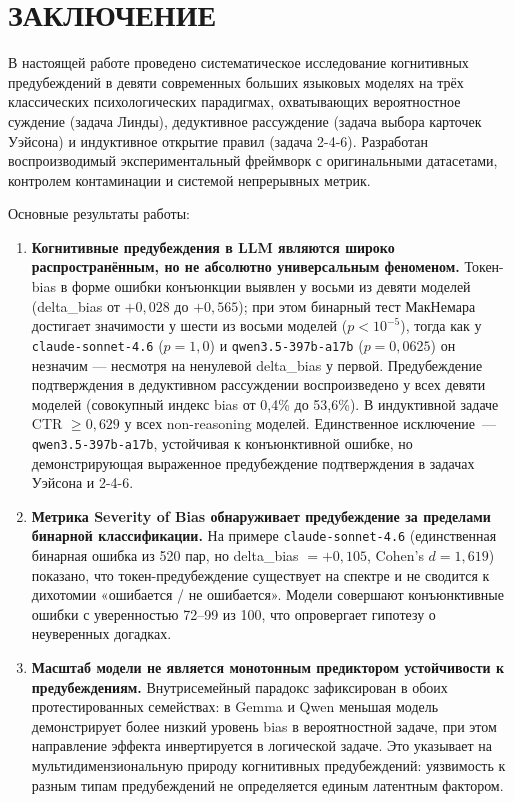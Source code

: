 \chapter*{ЗАКЛЮЧЕНИЕ}

В настоящей работе проведено систематическое исследование когнитивных предубеждений в девяти современных больших языковых моделях на трёх классических психологических парадигмах, охватывающих вероятностное суждение (задача Линды), дедуктивное рассуждение (задача выбора карточек Уэйсона) и индуктивное открытие правил (задача 2-4-6). Разработан воспроизводимый экспериментальный фреймворк с оригинальными датасетами, контролем контаминации и системой непрерывных метрик.

Основные результаты работы:

\begin{enumerate}
  \item \textbf{Когнитивные предубеждения в LLM являются широко распространённым, но не абсолютно универсальным феноменом.} Токен-bias в форме ошибки конъюнкции выявлен у восьми из девяти моделей (delta\_bias от $+0{,}028$ до $+0{,}565$); при этом бинарный тест МакНемара достигает значимости у шести из восьми моделей ($p < 10^{-5}$), тогда как у \texttt{claude-sonnet-4.6} ($p = 1{,}0$) и \texttt{qwen3.5-397b-a17b} ($p = 0{,}0625$) он незначим --- несмотря на ненулевой delta\_bias у первой. Предубеждение подтверждения в дедуктивном рассуждении воспроизведено у всех девяти моделей (совокупный индекс bias от 0,4\% до 53,6\%). В индуктивной задаче CTR $\geq 0{,}629$ у всех non-reasoning моделей. Единственное исключение~--- \texttt{qwen3.5-397b-a17b}, устойчивая к конъюнктивной ошибке, но демонстрирующая выраженное предубеждение подтверждения в задачах Уэйсона и 2-4-6.

  \item \textbf{Метрика Severity of Bias обнаруживает предубеждение за пределами бинарной классификации.} На примере \texttt{claude-sonnet-4.6} (единственная бинарная ошибка из 520 пар, но delta\_bias $= +0{,}105$, Cohen's $d = 1{,}619$) показано, что токен-предубеждение существует на спектре и не сводится к дихотомии «ошибается / не ошибается». Модели совершают конъюнктивные ошибки с уверенностью 72--99 из 100, что опровергает гипотезу о неуверенных догадках.

  \item \textbf{Масштаб модели не является монотонным предиктором устойчивости к предубеждениям.} Внутрисемейный парадокс зафиксирован в обоих протестированных семействах: в Gemma и Qwen меньшая модель демонстрирует более низкий уровень bias в вероятностной задаче, при этом направление эффекта инвертируется в логической задаче. Это указывает на мультидимензиональную природу когнитивных предубеждений: уязвимость к разным типам предубеждений не определяется единым латентным фактором.


\end{enumerate}
